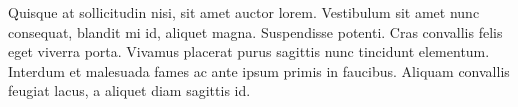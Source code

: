 Quisque at sollicitudin nisi, sit amet auctor lorem. Vestibulum sit amet nunc consequat, blandit mi id, aliquet magna. Suspendisse potenti. Cras convallis felis eget viverra porta. Vivamus placerat purus sagittis nunc tincidunt elementum. Interdum et malesuada fames ac ante ipsum primis in faucibus. Aliquam convallis feugiat lacus, a aliquet diam sagittis id.
